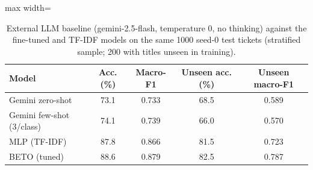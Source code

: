 \begin{table}[!t]
\centering
\caption{External LLM baseline (gemini-2.5-flash, temperature 0, no thinking) against the fine-tuned and TF-IDF models on the same 1000 seed-0 test tickets (stratified sample; 200 with titles unseen in training).}
\label{tab:gemini}
\footnotesize
\begin{adjustbox}{max width=\columnwidth}
\begin{tabular}{lcccc}
\hline
Model & Acc. (\%) & Macro-F1 & Unseen acc. (\%) & Unseen macro-F1 \\
\hline
Gemini zero-shot & 73.1 & 0.733 & 68.5 & 0.589 \\
Gemini few-shot (3/class) & 74.1 & 0.739 & 66.0 & 0.570 \\
MLP (TF-IDF) & 87.8 & 0.866 & 81.5 & 0.723 \\
BETO (tuned) & 88.6 & 0.879 & 82.5 & 0.787 \\
\hline
\end{tabular}
\end{adjustbox}
\end{table}
